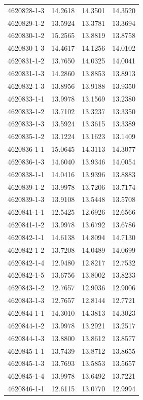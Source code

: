 \begin{longtable}{lrrr}
4620828-1-3 & 14.2618 & 14.3501 & 14.3520 \\
4620829-1-2 & 13.5924 & 13.3781 & 13.3694 \\
4620830-1-2 & 15.2565 & 13.8819 & 13.8758 \\
4620830-1-3 & 14.4617 & 14.1256 & 14.0102 \\
4620831-1-2 & 13.7650 & 14.0325 & 14.0041 \\
4620831-1-3 & 14.2860 & 13.8853 & 13.8913 \\
4620832-1-3 & 13.8956 & 13.9188 & 13.9350 \\
4620833-1-1 & 13.9978 & 13.1569 & 13.2380 \\
4620833-1-2 & 13.7102 & 13.3237 & 13.3350 \\
4620833-1-3 & 13.5924 & 13.3615 & 13.3389 \\
4620835-1-2 & 13.1224 & 13.1623 & 13.1409 \\
4620836-1-1 & 15.0645 & 14.3113 & 14.3077 \\
4620836-1-3 & 14.6040 & 13.9346 & 14.0054 \\
4620838-1-1 & 14.0416 & 13.9396 & 13.8883 \\
4620839-1-2 & 13.9978 & 13.7206 & 13.7174 \\
4620839-1-3 & 13.9108 & 13.5448 & 13.5708 \\
4620841-1-1 & 12.5425 & 12.6926 & 12.6566 \\
4620841-1-2 & 13.9978 & 13.6792 & 13.6786 \\
4620842-1-1 & 14.6138 & 14.8094 & 14.7130 \\
4620842-1-2 & 13.7208 & 14.0489 & 14.0699 \\
4620842-1-4 & 12.9480 & 12.8217 & 12.7532 \\
4620842-1-5 & 13.6756 & 13.8002 & 13.8233 \\
4620843-1-2 & 12.7657 & 12.9036 & 12.9006 \\
4620843-1-3 & 12.7657 & 12.8144 & 12.7721 \\
4620844-1-1 & 14.3010 & 14.3813 & 14.3023 \\
4620844-1-2 & 13.9978 & 13.2921 & 13.2517 \\
4620844-1-3 & 13.8800 & 13.8612 & 13.8577 \\
4620845-1-1 & 13.7439 & 13.8712 & 13.8655 \\
4620845-1-3 & 13.7693 & 13.5853 & 13.5657 \\
4620845-1-4 & 13.9978 & 13.6492 & 13.7221 \\
4620846-1-1 & 12.6115 & 13.0770 & 12.9994 \\

\end{longtable}
